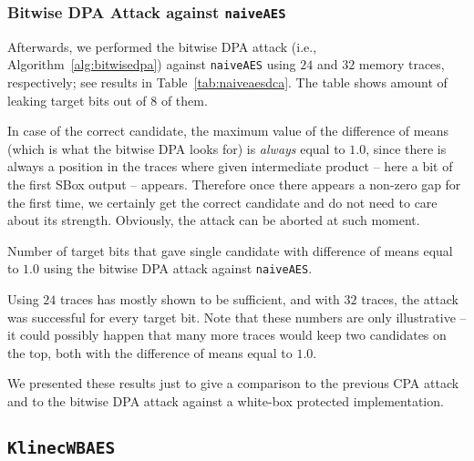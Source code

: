 \subsubsection{Bitwise DPA Attack against {\tt naiveAES}}
	
	Afterwards, we performed the bitwise DPA attack (i.e., Algorithm~\ref{alg:bitwisedpa}) against {\tt naiveAES} using $24$ and $32$ memory traces, respectively; see results in Table~\ref{tab:naiveaesdca}. The table shows amount of leaking target bits out of $8$ of them.
	
	\begin{note}
	\label{note:unprotect}
		In case of the correct candidate, the maximum value of the difference of means (which is what the bitwise DPA looks for) is {\em always} equal to $1.0$, since there is always a position in the traces where given intermediate product -- here a bit of the first SBox output -- appears. Therefore once there appears a non-zero gap for the first time, we certainly get the correct candidate and do not need to care about its strength. Obviously, the attack can be aborted at such moment.
	\end{note}
	
	\begin{table}[h]
		\begin{center}
		
		\end{center}
	\caption{Number of target bits that gave single candidate with difference of means equal to $1.0$ using the bitwise DPA attack against {\tt naiveAES}.}
	\label{tab:naiveaesdca}
	\end{table}
	
	Using $24$ traces has mostly shown to be sufficient, and with $32$ traces, the attack was successful for every target bit. Note that these numbers are only illustrative -- it could possibly happen that many more traces would keep two candidates on the top, both with the difference of means equal to $1.0$.
	
	We presented these results just to give a comparison to the previous CPA attack and to the bitwise DPA attack against a white-box protected implementation.



\subsection{\tt KlinecWBAES}
\label{sec:klinecwbaes}

